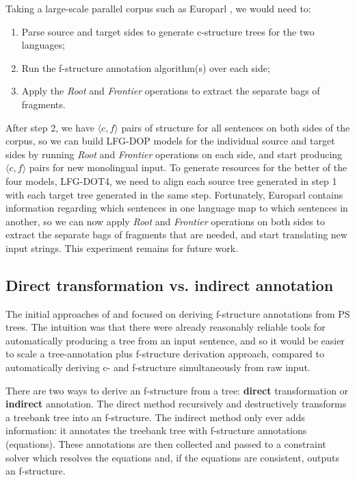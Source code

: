 \documentclass[output=paper,hidelinks]{langscibook}
\begin{document}
Taking a large-scale parallel corpus such as Europarl \citep{Koehn}, we would need to:
\begin{enumerate}
    \item Parse source and target sides to generate c-structure trees for the two languages;
    \item Run the f-structure annotation algorithm(s) over each side;
    \item Apply the {\em Root} and {\em Frontier} operations to extract the separate bags of fragments. 
\end{enumerate}
After step 2, we have $\langle c,f\rangle$ pairs of structure for all sentences on both sides of the corpus, so we can build LFG-DOP models for the individual source and target sides by running {\em Root} and {\em Frontier} operations on each side, and start producing $\langle c,f\rangle$ pairs for new monolingual input. To generate resources for the better of the four models, LFG-DOT4, we need to align each source tree generated in step 1 with each target tree generated in the same step. Fortunately, Europarl contains information regarding which sentences in one language map to which sentences in another, so we can now apply {\em Root} and {\em Frontier} operations on both sides to extract the separate bags of fragments that are needed, and start translating new input strings. This experiment remains for future work.

\subsection{Direct transformation vs. indirect annotation}
The initial approaches of \citet{van1999semi} and \citet{van1999deriving} focused on deriving f-structure annotations from PS trees. The intuition was that there were already reasonably reliable tools for automatically producing a tree from an input sentence, and so it would be easier to scale a tree-annotation plus f-structure derivation approach, compared to automatically deriving c- and f-structure simultaneously from raw input.

There are two ways to derive an f-structure from a tree: \textbf{direct} transformation or \textbf{indirect} annotation. The direct method recursively and destructively transforms a treebank tree into an f-structure. The indirect method only ever adds information: it annotates the treebank tree with f-structure annotations (equations). These annotations are then collected and passed to a constraint solver which resolves the equations and, if the equations are consistent, outputs an f-structure. 
\end{document}
